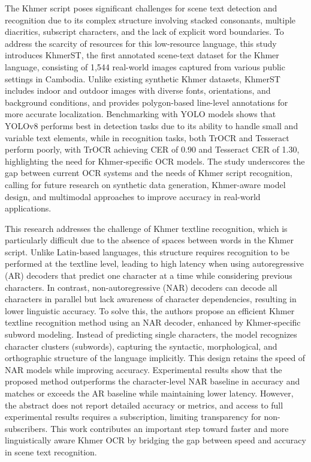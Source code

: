 \citet{nom2024khmerst} The Khmer script poses significant challenges for scene text detection 
and recognition due to its complex structure involving stacked consonants, multiple diacritics, 
subscript characters, and the lack of explicit word boundaries. To address the scarcity of 
resources for this low-resource language, this study introduces KhmerST, the first annotated 
scene-text dataset for the Khmer language, consisting of 1,544 real-world images captured 
from various public settings in Cambodia. Unlike existing synthetic Khmer datasets, 
KhmerST includes indoor and outdoor images with diverse fonts, orientations, and 
background conditions, and provides polygon-based line-level annotations for more accurate 
localization. Benchmarking with YOLO models shows that YOLOv8 performs best in detection 
tasks due to its ability to handle small and variable text elements, while in recognition 
tasks, both TrOCR and Tesseract perform poorly, with TrOCR achieving CER of 0.90 and 
Tesseract CER of 1.30, highlighting the need for Khmer-specific OCR models. The study 
underscores the gap between current OCR systems and the needs of Khmer script recognition, 
calling for future research on synthetic data generation, Khmer-aware model design, 
and multimodal approaches to improve accuracy in real-world applications.

\citet{Rina2025} This research addresses the challenge of Khmer textline recognition, 
which is particularly difficult due to the absence of spaces between words in the Khmer script. 
Unlike Latin-based languages, this structure requires recognition to be performed at the textline level, 
leading to high latency when using autoregressive (AR) decoders that predict one character at a 
time while considering previous characters. In contrast, non-autoregressive (NAR) decoders can decode 
all characters in parallel but lack awareness of character dependencies, resulting in lower linguistic 
accuracy. To solve this, the authors propose an efficient Khmer textline recognition method using an NAR 
decoder, enhanced by Khmer-specific subword modeling. Instead of predicting single characters, the model 
recognizes character clusters (subwords), capturing the syntactic, morphological, and orthographic 
structure of the language implicitly. This design retains the speed of NAR models while improving accuracy. 
Experimental results show that the proposed method outperforms the character-level NAR baseline 
in accuracy and matches or exceeds the AR baseline while maintaining lower latency. However, 
the abstract does not report detailed accuracy or metrics, and access to full experimental results 
requires a subscription, limiting transparency for non-subscribers. This work contributes an 
important step toward faster and more linguistically aware Khmer OCR by bridging the gap between 
speed and accuracy in scene text recognition.
    

